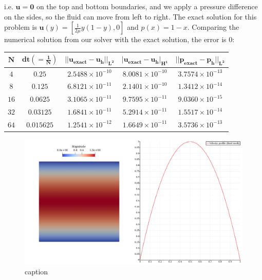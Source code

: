 \documentclass[a4paper,11pt,oneside]{book}
\begin{document}
\begin{center}
\end{center}
i.e. $\mathbf{u=0}$ on the top and bottom boundaries, and we apply a pressure difference on the sides, so the fluid can move from left to right. The exact solution for this problem is $\mathbf{u}(y) = [\frac{1}{2\mu} y (1-y), 0]$ and $p(x) = 1-x$. Comparing the numerical solution from our solver with the exact solution, the error is 0:

\begin{center}
\begin{tabular}{| c | c | c | c | c |}
\hline
$\mathbf{N}$ & $\mathbf{dt (= \frac{1}{N})}$ & $\mathbf{|| u_{exact} - u_h ||_{L^2}}$ & $ \mathbf{ | u_{exact} - u_h |_{H^1}}$ & $  \mathbf{ || p_{exact} - p_h ||_{L^2}}$ \\
\hline
$ 4 $ & $ 0.25 $ & $2.5488 \times 10^{-10}$ & $8.0081 \times 10^{-10}$ &  $ 3.7574 \times 10^{-13}$ \\
\hline
$ 8$ & $ 0.125 $ & $6.8121  \times 10^{-11}$ & $2.1401 \times 10^{-10}$ &  $ 1.3412  \times 10^{-14}$ \\
\hline
$ 16 $ & $ 0.0625 $ & $ 3.1065 \times 10^{-11}$ & $9.7595 \times 10^{-11}$ & $ 9.0360 \times 10^{-15}$ \\
\hline
$ 32$ & $ 0.03125 $ & $1.6841 \times 10^{-11}$ & $5.2914 \times 10^{-11}$ &  $ 1.5517 \times 10^{-14}$ \\
\hline
$ 64$ & $ 0.015625 $ & $1.2541 \times 10^{-12}$ & $1.6649 \times 10^{-11}$ &  $ 3.5736 \times 10^{-13}$ \\
\hline
\end{tabular}
\end{center}

\begin{figure}[ht]
\centering
\includegraphics[width=\textwidth]{images/velocity_fixed.png}
\caption{caption}
\end{figure}
\end{document}
